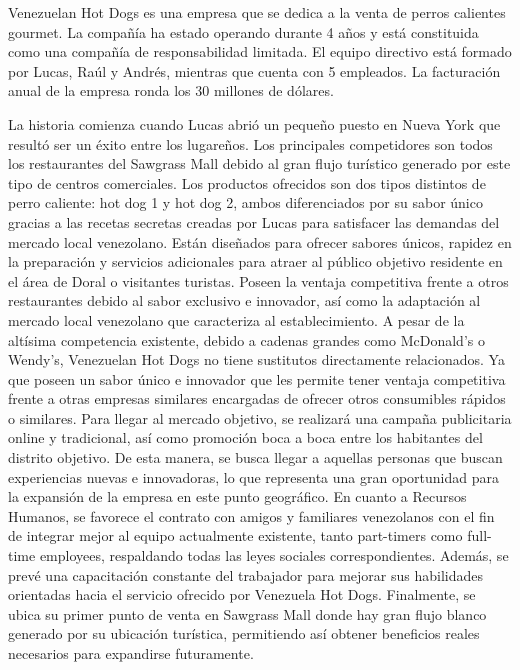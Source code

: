 Venezuelan Hot Dogs es una empresa que se dedica a la venta de perros calientes gourmet. La compañía ha estado operando durante 4 años y está constituida como una compañía de responsabilidad limitada. El equipo directivo está formado por Lucas, Raúl y Andrés, mientras que cuenta con 5 empleados. La facturación anual de la empresa ronda los 30 millones de dólares.

La historia comienza cuando Lucas abrió un pequeño puesto en Nueva York que resultó ser un éxito entre los lugareños. Los principales competidores son todos los restaurantes del Sawgrass Mall debido al gran flujo turístico generado por este tipo de centros comerciales.
Los productos ofrecidos son dos tipos distintos de perro caliente: hot dog 1 y hot dog 2, ambos diferenciados por su sabor único gracias a las recetas secretas creadas por Lucas para satisfacer las demandas del mercado local venezolano. Están diseñados para ofrecer sabores únicos, rapidez en la preparación y servicios adicionales para atraer al público objetivo residente en el área de Doral o visitantes turistas. Poseen la ventaja competitiva frente a otros restaurantes debido al sabor exclusivo e innovador, así como la adaptación al mercado local venezolano que caracteriza al establecimiento.
A pesar de la altísima competencia existente, debido a cadenas grandes como McDonald's o Wendy's, Venezuelan Hot Dogs no tiene sustitutos directamente relacionados. Ya que poseen un sabor único e innovador que les permite tener ventaja competitiva frente a otras empresas similares encargadas de ofrecer otros consumibles rápidos o similares.
Para llegar al mercado objetivo, se realizará una campaña publicitaria online y tradicional, así como promoción boca a boca entre los habitantes del distrito objetivo. De esta manera, se busca llegar a aquellas personas que buscan experiencias nuevas e innovadoras, lo que representa una gran oportunidad para la expansión de la empresa en este punto geográfico.
En cuanto a Recursos Humanos, se favorece el contrato con amigos y familiares venezolanos con el fin de integrar mejor al equipo actualmente existente, tanto part-timers como full-time employees, respaldando todas las leyes sociales correspondientes. Además, se prevé una capacitación constante del trabajador para mejorar sus habilidades orientadas hacia el servicio ofrecido por Venezuela Hot Dogs. Finalmente, se ubica su primer punto de venta en Sawgrass Mall donde hay gran flujo blanco generado por su ubicación turística, permitiendo así obtener beneficios reales necesarios para expandirse futuramente.
